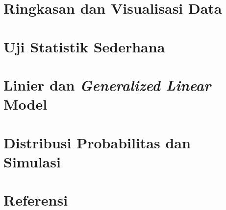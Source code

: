 \documentclass[12pt,]{krantz}
\begin{document}
\hypertarget{ringkasan-dan-visualisasi-data}{%
\chapter{Ringkasan dan Visualisasi Data}\label{ringkasan-dan-visualisasi-data}}

\hypertarget{uji-statistik-sederhana}{%
\chapter{Uji Statistik Sederhana}\label{uji-statistik-sederhana}}

\hypertarget{linier-dan-generalized-linear-model}{%
\chapter{\texorpdfstring{Linier dan \emph{Generalized Linear} Model}{Linier dan Generalized Linear Model}}\label{linier-dan-generalized-linear-model}}

\hypertarget{distribusi-probabilitas-dan-simulasi}{%
\chapter{Distribusi Probabilitas dan Simulasi}\label{distribusi-probabilitas-dan-simulasi}}

\hypertarget{referensi}{%
\chapter*{Referensi}\label{referensi}}
\end{document}
